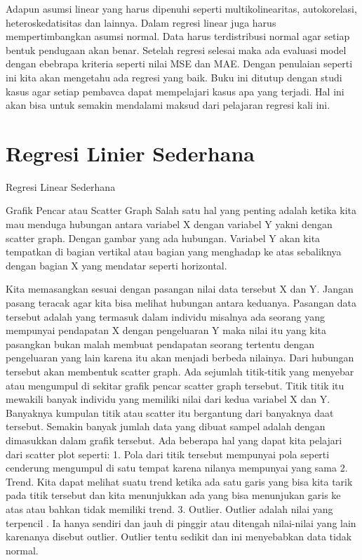 \documentclass[
]{book}
\theoremstyle{definition}
\theoremstyle{definition}
\theoremstyle{definition}
\theoremstyle{definition}
\theoremstyle{remark}
\begin{document}
Adapun asumsi linear yang harus dipenuhi seperti multikolinearitas, autokorelasi, heteroskedatisitas dan lainnya. Dalam regresi linear juga harus mempertimbangkan asumsi normal. Data harus terdistribusi normal agar setiap bentuk pendugaan akan benar.
Setelah regresi selesai maka ada evaluasi model dengan ebebrapa kriteria seperti nilai MSE dan MAE. Dengan penulaian seperti ini kita akan mengetahu ada regresi yang baik. Buku ini ditutup dengan studi kasus agar setiap pembavca dapat mempelajari kasus apa yang terjadi. Hal ini akan bisa untuk semakin mendalami maksud dari pelajaran regresi kali ini.

\hypertarget{regresi-linier-sederhana}{%
\chapter{Regresi Linier Sederhana}\label{regresi-linier-sederhana}}

Regresi Linear Sederhana

Grafik Pencar atau Scatter Graph
Salah satu hal yang penting adalah ketika kita mau menduga hubungan antara variabel X dengan variabel Y yakni dengan scatter graph. Dengan gambar yang ada hubungan. Variabel Y akan kita tempatkan di bagian vertikal atau bagian yang menghadap ke atas sebaliknya dengan bagian X yang mendatar seperti horizontal.

Kita memasangkan sesuai dengan pasangan nilai data tersebut X dan Y. Jangan pasang teracak agar kita bisa melihat hubungan antara keduanya. Pasangan data tersebut adalah yang termasuk dalam individu misalnya ada seorang yang mempunyai pendapatan X dengan pengeluaran Y maka nilai itu yang kita pasangkan bukan malah membuat pendapatan seorang tertentu dengan pengeluaran yang lain karena itu akan menjadi berbeda nilainya.
Dari hubungan tersebut akan membentuk scatter graph. Ada sejumlah titik-titik yang menyebar atau mengumpul di sekitar grafik pencar scatter graph tersebut. Titik titik itu mewakili banyak individu yang memiliki nilai dari kedua variabel X dan Y.
Banyaknya kumpulan titik atau scatter itu bergantung dari banyaknya daat tersebut. Semakin banyak jumlah data yang dibuat sampel adalah dengan dimasukkan dalam grafik tersebut. Ada beberapa hal yang dapat kita pelajari dari scatter plot seperti:
1. Pola dari titik tersebut mempunyai pola seperti cenderung mengumpul di satu tempat karena nilanya mempunyai yang sama
2. Trend. Kita dapat melihat suatu trend ketika ada satu garis yang bisa kita tarik pada titik tersebut dan kita menunjukkan ada yang bisa menunjukan garis ke atas atau bahkan tidak memiliki trend.
3. Outlier. Outlier adalah nilai yang terpencil . Ia hanya sendiri dan jauh di pinggir atau ditengah nilai-nilai yang lain karenanya disebut outlier. Outlier tentu sedikit dan ini menyebabkan data tidak normal.
\end{document}

